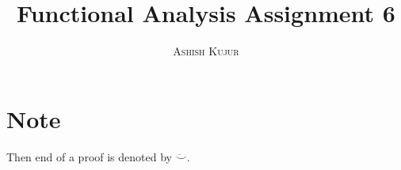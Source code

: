 \documentclass[14pt]{extarticle}
\title{Functional Analysis Assignment 6}
\author{\textsc{Ashish Kujur}}
\date{}
\theoremstyle{definition}
\numberwithin{equation}{section}
\theoremstyle{remark}
\theoremstyle{plain}
\newcommand{\Smile}{$\ddot\smile$}
\begin{document}
\maketitle

\section*{Note}
Then end of a proof is denoted by \Smile.
\tableofcontents













\end{document}
